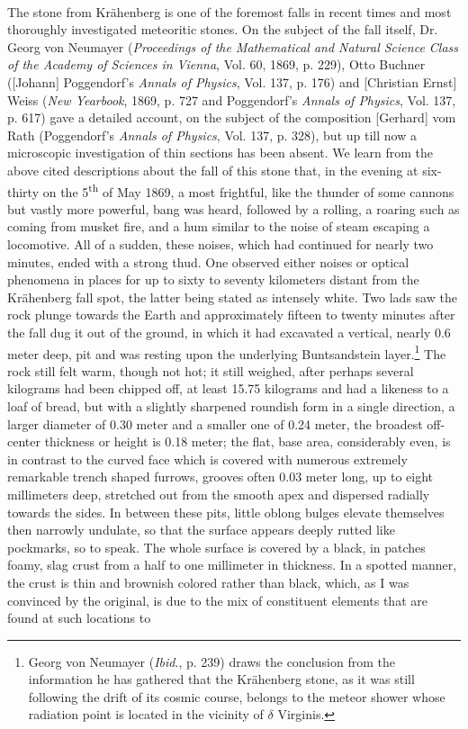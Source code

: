 \documentclass[a4paper, 12pt, oneside]{article}
\begin{document}
\paragraph*{}
The stone from Krähenberg is one of the foremost falls in recent times and most thoroughly investigated meteoritic stones. On the subject of the fall itself, Dr. Georg von Neumayer (\emph{Proceedings of the Mathematical and Natural Science Class of the Academy of Sciences in Vienna}, Vol. 60, 1869, p. 229), Otto Buchner ([Johann] Poggendorf's \emph{Annals of Physics}, Vol. 137, p. 176) and [Christian Ernst] Weiss (\emph{New Yearbook}, 1869, p. 727 and Poggendorf's \emph{Annals of Physics}, Vol. 137, p. 617) gave a detailed account, on the subject of the composition [Gerhard] vom Rath (Poggendorf's \emph{Annals of Physics}, Vol. 137, p. 328), but up till now a microscopic investigation of thin sections has been absent. We learn from the above cited descriptions about the fall of this stone that, in the evening at six-thirty on the 5\textsuperscript{th} of May 1869, a most frightful, like the thunder of some cannons but vastly more powerful, bang was heard, followed by a rolling, a roaring such as coming from musket fire, and a hum similar to the noise of steam escaping a locomotive. All of a sudden, these noises, which had continued for nearly two minutes, ended with a strong thud. One observed either noises or optical phenomena in places for up to sixty to seventy kilometers distant from the Krähenberg fall spot, the latter being stated as intensely white. Two lads saw the rock plunge towards the Earth and approximately fifteen to twenty minutes after the fall dug it out of the ground, in which it had excavated a vertical, nearly 0.6 meter deep, pit and was resting upon the underlying Buntsandstein layer.\footnote{Georg von Neumayer (\emph{Ibid}., p. 239) draws the conclusion from the information he has gathered that the Krähenberg stone, as it was still following the drift of its cosmic course, belongs to the meteor shower whose radiation point is located in the vicinity of $\delta$ Virginis.} The rock still felt warm, though not hot; it still weighed, after perhaps several kilograms had been chipped off, at least 15.75 kilograms and had a likeness to a loaf of bread, but with a slightly sharpened roundish form in a single direction, a larger diameter of 0.30 meter and a smaller one of 0.24 meter, the broadest off-center thickness or height is 0.18 meter; the flat, base area, considerably even, is in contrast to the curved face which is covered with numerous extremely remarkable trench shaped furrows, grooves often 0.03 meter long, up to eight millimeters deep, stretched out from the smooth apex and dispersed radially towards the sides.  In between these pits, little oblong bulges elevate themselves then narrowly undulate, so that the surface appears deeply rutted like pockmarks, so to speak. The whole surface is covered by a black, in patches foamy, slag crust from a half to one millimeter in thickness. In a spotted manner, the crust is thin and brownish colored rather than black, which, as I was convinced by the original, is due to the mix of constituent elements that are found at such locations to 
\end{document}
